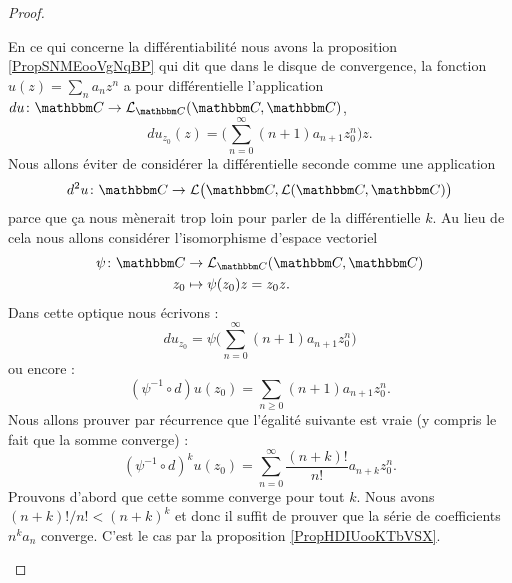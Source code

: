 \begin{proof}
\begin{subproof}
        En ce qui concerne la différentiabilité nous avons la proposition \ref{PropSNMEooVgNqBP} qui dit que dans le disque de convergence, la fonction \( u(z)=\sum_na_nz^n\) a pour différentielle l'application \( du\colon \eC\to \aL_{\eC}(\eC,\eC)\),
        \begin{equation}
            du_{z_0}(z)=\big( \sum_{n=0}^{\infty}(n+1)a_{n+1}z_0^n \big)z.
        \end{equation}
        Nous allons éviter de considérer la différentielle seconde comme une application
        \begin{equation}
            d^2u\colon \eC\to \aL\big( \eC,\aL(\eC,\eC) \big)
        \end{equation}
        parce que ça nous mènerait trop loin pour parler de la différentielle \( k\)\ieme. Au lieu de cela nous allons considérer l'isomorphisme d'espace vectoriel
        \begin{equation}
            \begin{aligned}
                \psi\colon \eC&\to \aL_{\eC}(\eC,\eC) \\
                z_0&\mapsto \psi(z_0) z=z_0z.
            \end{aligned}
        \end{equation}
        Dans cette optique nous écrivons :
        \begin{equation}
            du_{z_0}=\psi\big( \sum_{n=0}^{\infty}(n+1)a_{n+1} z_0^n\big)
        \end{equation}
        ou encore :
        \begin{equation}
            (\psi^{-1}\circ d)u(z_0)=\sum_{n\geq 0}(n+1)a_{n+1}z_{0}^n.
        \end{equation}
        Nous allons prouver par récurrence que l'égalité suivante est vraie (y compris le fait que la somme converge) :
        \begin{equation}
            (\psi^{-1}\circ d)^ku(z_0)=\sum_{n=0}^{\infty}\frac{ (n+k)! }{ n! }a_{n+k}z_0^n.
        \end{equation}
        Prouvons d'abord que cette somme converge pour tout \( k\). Nous avons \( (n+k)!/n!<(n+k)^k\) et donc il suffit de prouver que la série de coefficients \( n^ka_n\) converge. C'est le cas par la proposition \ref{PropHDIUooKTbVSX}.


\end{subproof}
\end{proof}
